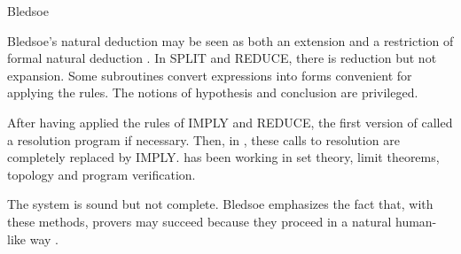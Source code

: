 \begin{entry}{Bledsoe}
\begin{clarifications}
Bledsoe's natural deduction may be seen as both an extension and 
a restriction of formal natural deduction . 
In SPLIT and REDUCE, there is reduction but not expansion. 
Some subroutines convert expressions into forms convenient 
for applying the rules. 
The notions of hypothesis and conclusion are privileged.
\end{clarifications}

\begin{history}
After having applied the rules of IMPLY and REDUCE, the first version of
{\sc \Bledsoe} \cite{bledsoe:1971} called a resolution program if necessary. 
Then, in \cite{bledsoe:1972}, these calls to resolution are completely 
replaced by IMPLY. 
\Bledsoe has been working in set theory, limit theorems, topology and 
program verification.
\end{history}

\begin{technicalities}
The system is sound but not complete.
Bledsoe emphasizes the fact that, with these methods, provers may succeed 
because they proceed in a natural human-like way
\cite{bledsoe:1977}.
\end{technicalities}



\end{entry}

